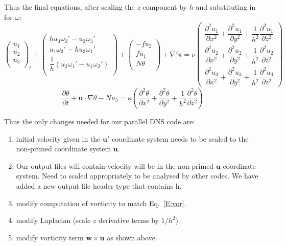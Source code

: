 \documentclass[12pt]{article}
\newcommand{\uv}{\mathbf u}
\newcommand{\up}{\mathbf u'}
\newcommand{\w}{\mathbf w}
\newcommand{\grad}{\nabla}
\newcommand{\gradp}{\nabla'}
\begin{document}
Thus the final equations, after scaling the $z$ component by $h$
and substituting in for $\omega$:
\[
\begin{pmatrix} u_1 \\
                u_2 \\
                u_3 \\
\end{pmatrix}_t
  + 
\begin{pmatrix}  h  u_3 \omega_2' -  u_2 \omega_3'   \\
                   u_1 \omega_3' -   h u_3 \omega_1'   \\
              \dfrac{1}{h} \left(  u_2 \omega_1' - u_1 \omega_2' \right)  \\
\end{pmatrix}  
+ 
\begin{pmatrix} -f u_2 \\
                f u_1 \\
                N \theta  \\
\end{pmatrix}  
+ \gradp \pi = \nu 
\begin{pmatrix} \dfrac{\partial^2 u_1}{\partial x^2} + 
                \dfrac{\partial^2 u_1}{\partial y^2} + 
                \dfrac{1}{h^2}\dfrac{\partial^2 u_1}{\partial z^2}   \\[5mm]
                \dfrac{\partial^2 u_2}{\partial x^2} + 
                \dfrac{\partial^2 u_2}{\partial y^2} + 
                \dfrac{1}{h^2}\dfrac{\partial^2 u_2}{\partial z^2}   \\[5mm]
                \dfrac{\partial^2 u_3}{\partial x^2} + 
                \dfrac{\partial^2 u_3}{\partial y^2} + 
                \dfrac{1}{h^2}\dfrac{\partial^2 u_3}{\partial z^2}
\end{pmatrix}
\]
\[
\frac{ \partial  \theta }{\partial t}  + \uv \cdot \grad \theta - 
N u_3  = \kappa \left(
                \dfrac{\partial^2 \theta}{\partial x^2} + 
                \dfrac{\partial^2 \theta}{\partial y^2} + 
                \dfrac{1}{h^2}\dfrac{\partial^2 \theta}{\partial z^2}
\right)
\]



Thus the only changes needed for our parallel DNS code are:
\begin{enumerate}
\item initial velocity given in the $\up$ coordinate system 
needs to be scaled to the non-primed coordinate system $\uv$.
\item Our output files will contain velocity will be in the non-primed 
$\uv$ coordinate system.  Need to scaled appropriately  to be analysed
by other codes.  We have added a new output file header type that
contains h.  
\item modify computation of vorticity to match Eq.~\ref{E:vor}.
\item modify Laplacian (scale $z$ derivative terms by $1/h^2$).
\item modify vorticity term $\w \times \uv$ as shown above.
\end{enumerate}
\end{document}
